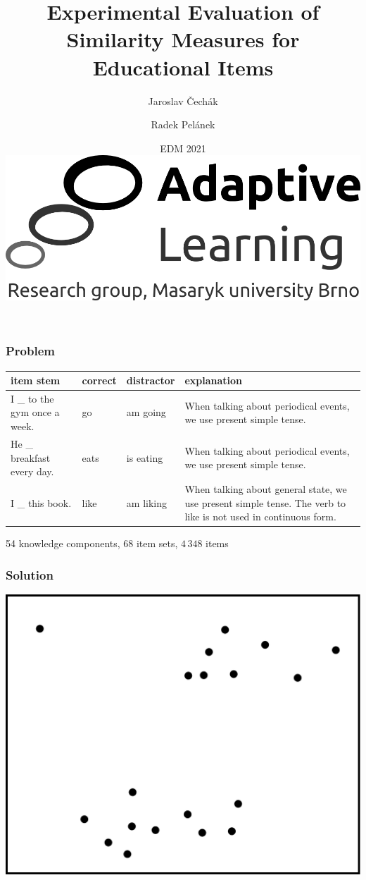\documentclass[bigger, aspectratio=169]{beamer}
\title{Experimental Evaluation of Similarity Measures for Educational Items}
\author{Jaroslav \v{C}ech\'ak \and Radek Pel\'anek\\[5mm]
}
\date{\vfill EDM 2021\hfill \includegraphics[width=.35\linewidth]{figures/al-logo}}
\begin{document}
\frame{\titlepage}

\begin{frame}
	\frametitle{Problem}
	\centering
	\footnotesize
	\begin{tabular}{p{.28\linewidth}llp{.43\linewidth}}
		\toprule
		item stem & correct & distractor & explanation \\
		\midrule
		I \_ to the gym once a week. & go & am going & When talking about
		periodical events, we use present simple tense. \\
		He \_ breakfast every day. & eats & is eating & When talking about
		periodical events, we use present simple tense. \\
		I \_ this book. & like & am liking & When talking about general state, we use present simple tense. The 
		verb to like is not used in continuous form. \\
		\bottomrule
	\end{tabular}
	
	\bigskip
	
	54 knowledge components, 68 item sets, $4\,348$ items 
	
\end{frame}

\begin{frame}
	\frametitle{Solution}
	\begin{center}
		\includegraphics[width=0.65\linewidth]{figures/similarity_visualization}
	\end{center}
\end{frame}
\end{document}
